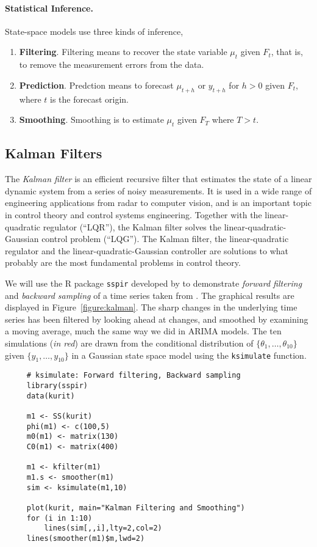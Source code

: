 \paragraph{Statistical Inference.}
State-space models use three kinds of inference,
\begin{enumerate}
\item \textbf{Filtering}. Filtering means to recover the state variable $\mu_t$ given $F_t$, that is, to remove the measurement errors from the data.
\item \textbf{Prediction}. Predction means to forecast $\mu_{t+h}$ or $y_{t+h}$ for $h>0$ given $F_t$, where $t$ is the forecast origin.
\item \textbf{Smoothing}. Smoothing is to estimate $\mu_t$ given $F_T$ where $T>t$.
\end{enumerate}

\subsection{Kalman Filters}
The \emph{Kalman filter} is an efficient recursive filter that estimates the state of a linear dynamic system from a series of noisy measurements. It is used in a wide range of engineering applications from radar to computer vision, and is an important topic in control theory and control systems engineering. Together with the linear-quadratic regulator (``LQR''), the Kalman filter solves the linear-quadratic-Gaussian control problem (``LQG'').
The Kalman filter, the linear-quadratic regulator and the linear-quadratic-Gaussian controller are solutions to what probably are the most fundamental problems in control theory.

We will use the R package \texttt{sspir} developed by  to demonstrate \emph{forward filtering} and \emph{backward sampling} of a time series taken from . The graphical results are displayed in Figure~\ref{figure:kalman}. The sharp changes in the underlying time series has been filtered by looking ahead at changes, and smoothed by examining a moving average, much the same way we did in ARIMA models. The ten simulations (\emph{in red}) are drawn from the conditional distribution of $\{\theta_1, \ldots, \theta_{10}\}$ given $\{y_1, \ldots ,y_{10}\}$ in a Gaussian state space model using the \texttt{ksimulate} function. 
\begin{verbatim}
     # ksimulate: Forward filtering, Backward sampling
     library(sspir)
     data(kurit)
     
     m1 <- SS(kurit)
     phi(m1) <- c(100,5)
     m0(m1) <- matrix(130)
     C0(m1) <- matrix(400)
     
     m1 <- kfilter(m1)
     m1.s <- smoother(m1)
     sim <- ksimulate(m1,10)
     
     plot(kurit, main="Kalman Filtering and Smoothing")
     for (i in 1:10)
         lines(sim[,,i],lty=2,col=2)
     lines(smoother(m1)$m,lwd=2)
\end{verbatim}

